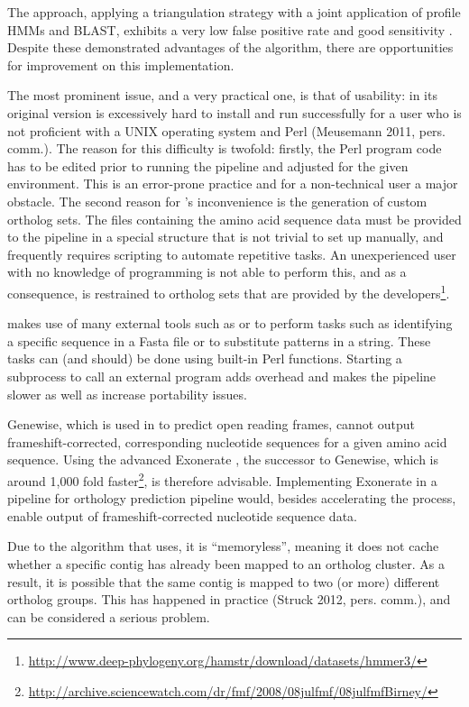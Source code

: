The \hamstr approach, applying a triangulation strategy with a joint application
of profile HMMs and BLAST, exhibits a very low false positive rate and good
sensitivity \citep{ebersberger2009}. Despite these demonstrated advantages of
the \hamstr algorithm, there are opportunities for improvement on this
implementation.

The most prominent issue, and a very practical one, is that of usability:
\hamstr in its original version is excessively hard to install and run
successfully for a user who is not proficient with a UNIX operating system and
Perl (Meusemann 2011, pers. comm.). The reason for this difficulty is twofold:
firstly, the Perl program code has to be edited prior to running the pipeline
and adjusted for the given environment. This is an error-prone practice and for
a non-technical user a major obstacle. The second reason for \hamstr's
inconvenience is the generation of custom ortholog sets. The files containing
the amino acid sequence data must be provided to the pipeline in a special
structure that is not trivial to set up manually, and frequently requires
scripting to automate repetitive tasks. An unexperienced user with no knowledge
of programming is not able to perform this, and as a consequence, is restrained
to ortholog sets that are provided by the
developers\footnote{\url{http://www.deep-phylogeny.org/hamstr/download/datasets/hmmer3/}}.

\hamstr makes use of many external tools such as  or  to
perform tasks such as identifying a specific sequence in a Fasta file or to
substitute patterns in a string. These tasks can (and should) be done using
built-in Perl functions. Starting a subprocess to call an external program adds
overhead and makes the pipeline slower as well as increase portability issues.

Genewise, which is used in \hamstr to predict open reading frames, cannot output
frameshift-corrected, corresponding nucleotide sequences for a given amino acid
sequence. Using the advanced Exonerate \citep{slater2005}, the successor to
Genewise, which is around 1,000 fold
faster\footnote{\url{http://archive.sciencewatch.com/dr/fmf/2008/08julfmf/08julfmfBirney/}},
is therefore advisable. Implementing Exonerate in a pipeline for orthology
prediction pipeline would, besides accelerating the process, enable output of
frameshift-corrected nucleotide sequence data.

Due to the algorithm that \hamstr uses, it is ``memoryless'', meaning it does
not cache whether a specific contig has already been mapped to an ortholog
cluster. As a result, it is possible that the same contig is mapped to two (or
more) different ortholog groups. This has happened in practice (Struck 2012,
pers. comm.), and can be considered a serious problem.

